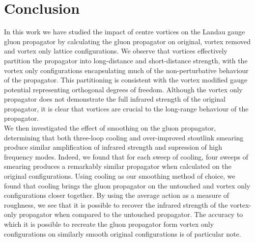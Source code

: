 
\chapter{Conclusion}\label{chapter:Conclusions}

\ifpdf
    \graphicspath{{Chapter8/Figs/Raster/}{Chapter8/Figs/PDF/}{Chapter8/Figs/}}
\else
    \graphicspath{{Chapter8/Figs/Vector/}{Chapter8/Figs/}}
\fi

In this work we have studied the impact of centre vortices on the Landau gauge gluon propagator by calculating the gluon propagator on original, vortex removed and vortex only lattice configurations. We observe that vortices effectively partition the propagator into long-distance and short-distance strength, with the vortex only configurations encapsulating much of the non-perturbative behaviour of the propagator. This partitioning is consistent with the vortex modified gauge potential representing orthogonal degrees of freedom. Although the vortex only propagator does not demonstrate the full infrared strength of the original propagator, it is clear that vortices are crucial to the long-range behaviour of the propagator.\\

We then investigated the effect of smoothing on the gluon propagator, determining that both three-loop cooling and over-improved stoutlink smearing produce similar amplification of infrared strength and supression of high frequency modes. Indeed, we found that for each sweep of cooling, four sweeps of smearing produces a remarkably similar propagator when calculated on the original configurations. Using cooling as our smoothing method of choice, we found that cooling brings the gluon propagator on the untouched and vortex only configurations closer together. By using the average action as a measure of roughness, we see that it is possible to recover the infrared strength of the vortex-only propagator when compared to the untouched propagator. The accuracy to which it is possible to recreate the gluon propagator form vortex only configurations on similarly smooth original configurations is of particular note.\\

